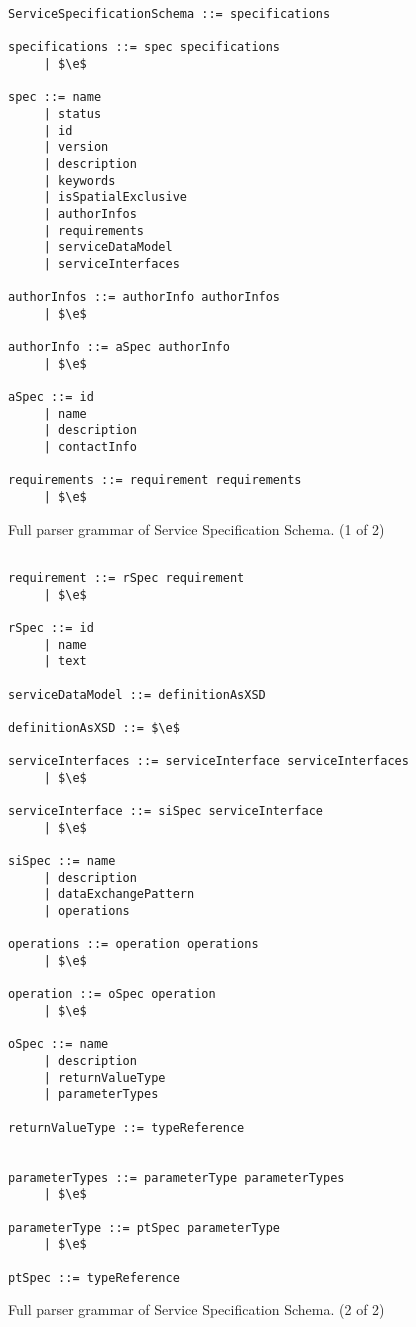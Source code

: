 \begin{figure}[h]
	\centering
	\begin{lstlisting}[keywordstyle={},breaklines=true]
ServiceSpecificationSchema ::= specifications

specifications ::= spec specifications
     | $\e$
     
spec ::= name
     | status
     | id
     | version
     | description
     | keywords
     | isSpatialExclusive
     | authorInfos
     | requirements
     | serviceDataModel
     | serviceInterfaces
     
authorInfos ::= authorInfo authorInfos
     | $\e$

authorInfo ::= aSpec authorInfo
     | $\e$

aSpec ::= id
     | name
     | description
     | contactInfo

requirements ::= requirement requirements
     | $\e$
     \end{lstlisting}
     \caption{Full parser grammar of Service Specification Schema. (1 of 2)}
     \label{fig:sSpecFull1}
\end{figure}
\newpage
\begin{figure}[h!]
     \centering
     \begin{lstlisting}[keywordstyle={}]

requirement ::= rSpec requirement
     | $\e$

rSpec ::= id
     | name
     | text

serviceDataModel ::= definitionAsXSD

definitionAsXSD ::= $\e$

serviceInterfaces ::= serviceInterface serviceInterfaces
     | $\e$

serviceInterface ::= siSpec serviceInterface
     | $\e$

siSpec ::= name
     | description
     | dataExchangePattern
     | operations

operations ::= operation operations
     | $\e$

operation ::= oSpec operation
     | $\e$

oSpec ::= name
     | description
     | returnValueType
     | parameterTypes

returnValueType ::= typeReference


parameterTypes ::= parameterType parameterTypes
     | $\e$

parameterType ::= ptSpec parameterType
     | $\e$

ptSpec ::= typeReference
	\end{lstlisting}
	\caption{Full parser grammar of Service Specification Schema. (2 of 2)}
	\label{fig:sSpecFull2}
\end{figure}